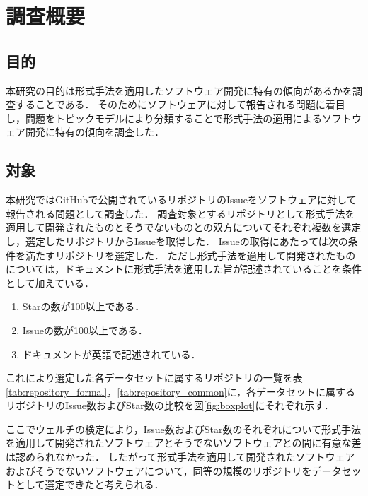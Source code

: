 \documentclass[main]{subfiles}
\begin{document}
\chapter{調査概要}

\section{目的}

本研究の目的は形式手法を適用したソフトウェア開発に特有の傾向があるかを調査することである．
そのためにソフトウェアに対して報告される問題に着目し，問題をトピックモデルにより分類することで形式手法の適用によるソフトウェア開発に特有の傾向を調査した．

\section{対象}
\label{sec:survey-target}

本研究ではGitHubで公開されているリポジトリのIssueをソフトウェアに対して報告される問題として調査した．
調査対象とするリポジトリとして形式手法を適用して開発されたものとそうでないものとの双方についてそれぞれ複数を選定し，選定したリポジトリからIssueを取得した．
Issueの取得にあたっては次の条件を満たすリポジトリを選定した．
ただし形式手法を適用して開発されたものについては，ドキュメントに形式手法を適用した旨が記述されていることを条件として加えている．

\begin{enumerate}
	\item Starの数が100以上である．
	\item Issueの数が100以上である．
	\item ドキュメントが英語で記述されている．
\end{enumerate}

これにより選定した各データセットに属するリポジトリの一覧を表\ref{tab:repository_formal}，\ref{tab:repository_common}に，各データセットに属するリポジトリのIssue数およびStar数の比較を図\ref{fig:boxplot}にそれぞれ示す．

ここでウェルチの検定により，Issue数およびStar数のそれぞれについて形式手法を適用して開発されたソフトウェアとそうでないソフトウェアとの間に有意な差は認められなかった．
したがって形式手法を適用して開発されたソフトウェアおよびそうでないソフトウェアについて，同等の規模のリポジトリをデータセットとして選定できたと考えられる．


\end{document}
